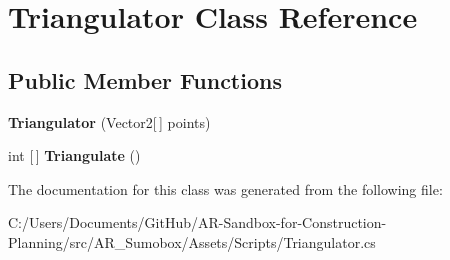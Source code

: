 \hypertarget{class_triangulator}{}\section{Triangulator Class Reference}
\label{class_triangulator}
\subsection*{Public Member Functions}
\begin{DoxyCompactItemize}
\item 
\mbox{\label{class_triangulator_ac8b7c647942722515ef899f4a36a0b19}} 
{\bfseries Triangulator} (Vector2\mbox{[}$\,$\mbox{]} points)
\item 
\mbox{\label{class_triangulator_ac7f1cdff8f4aecc3990ca8dd7bdf5ddb}} 
int \mbox{[}$\,$\mbox{]} {\bfseries Triangulate} ()
\end{DoxyCompactItemize}


The documentation for this class was generated from the following file\+:\begin{DoxyCompactItemize}
\item 
C\+:/\+Users/\+Documents/\+Git\+Hub/\+A\+R-\/\+Sandbox-\/for-\/\+Construction-\/\+Planning/src/\+A\+R\+\_\+\+Sumobox/\+Assets/\+Scripts/Triangulator.\+cs\end{DoxyCompactItemize}
